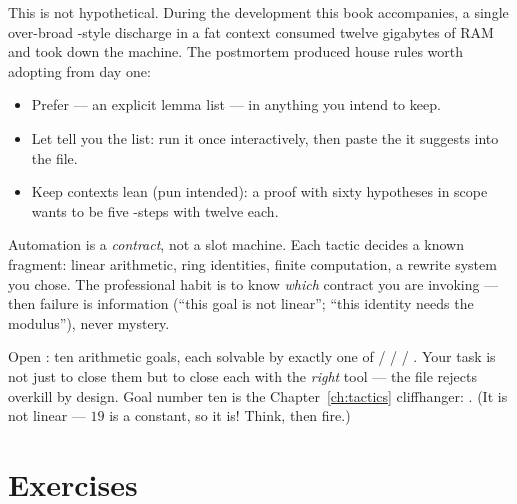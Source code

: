This is not hypothetical. During the development this book accompanies, a
single over-broad -style discharge in a fat context consumed
twelve gigabytes of RAM and took down the machine. The postmortem produced
house rules worth adopting from day one:

\begin{itemize}[leftmargin=1.4em]
\item Prefer  --- an explicit lemma list ---
  in anything you intend to keep.
\item Let  tell you the list: run it once interactively, then
  paste the  it suggests into the file.
\item Keep contexts lean (pun intended): a proof with sixty hypotheses in
  scope wants to be five -steps with twelve each.
\end{itemize}

\begin{bigidea}
Automation is a \emph{contract}, not a slot machine. Each tactic decides a
known fragment:  linear arithmetic,  ring identities,
 finite computation,  a rewrite system you
chose. The professional habit is to know \emph{which} contract you are
invoking --- then failure is information (``this goal is not linear''; ``this
identity needs the modulus''), never mystery.
\end{bigidea}

\begin{tryit}
Open : ten arithmetic goals, each solvable by
exactly one of  /  /  / .
Your task is not just to close them but to close each with the \emph{right}
tool --- the file rejects overkill by design. Goal number ten is the
Chapter~\ref{ch:tactics} cliffhanger:
. (It is not linear --- $19$ is a constant, so
it is! Think, then fire.)
\end{tryit}

\section*{Exercises}


